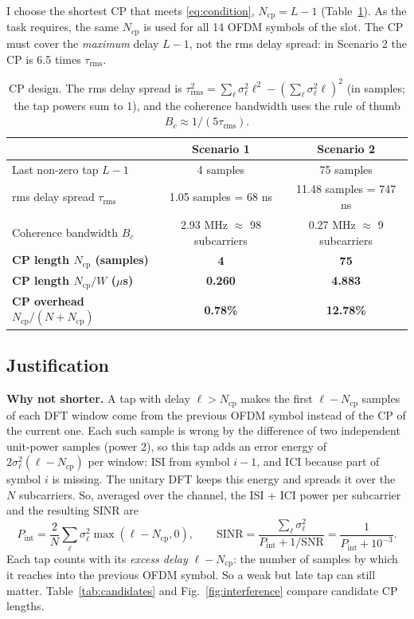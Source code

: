 \documentclass[11pt,a4paper]{article}
\newcommand{\Ncp}{N_{\mathrm{cp}}}
\newcommand{\SNR}{\mathrm{SNR}}
\begin{document}
I choose the shortest CP that meets \eqref{eq:condition}, $\Ncp = L - 1$ (Table~\ref{tab:cp}). As the
task requires, the same $\Ncp$ is used for all 14 OFDM symbols of the slot. The CP must cover the
\emph{maximum} delay $L - 1$, not the rms delay spread: in Scenario 2 the CP is 6.5 times $\tau_{\mathrm{rms}}$.

\begin{table}[!htb]
  \centering
  \caption{CP design. The rms delay spread is $\tau_{\mathrm{rms}}^2 = \sum_\ell \sigma_\ell^2 \ell^2 - (\sum_\ell \sigma_\ell^2 \ell)^2$ (in samples; the tap powers sum to 1), and the coherence bandwidth uses the rule of thumb $B_c \approx 1/(5\tau_{\mathrm{rms}})$.}
  \label{tab:cp}
  \begin{tabular}{lcc}
    \toprule
    & Scenario 1 & Scenario 2 \\
    \midrule
    Last non-zero tap $L - 1$                    & 4 samples          & 75 samples \\
    rms delay spread $\tau_{\mathrm{rms}}$       & 1.05 samples = 68 ns & 11.48 samples = 747 ns \\
    Coherence bandwidth $B_c$                    & 2.93 MHz $\approx$ 98 subcarriers & 0.27 MHz $\approx$ 9 subcarriers \\
    \midrule
    \textbf{CP length $\Ncp$ (samples)}          & \textbf{4}         & \textbf{75} \\
    \textbf{CP length $\Ncp/W$ ($\mu$s)}         & \textbf{0.260}     & \textbf{4.883} \\
    \textbf{CP overhead $\Ncp/(N + \Ncp)$}       & \textbf{0.78\%}    & \textbf{12.78\%} \\
    \bottomrule
  \end{tabular}
\end{table}

\subsection{Justification}

\textbf{Why not shorter.} A tap with delay $\ell > \Ncp$ makes the first $\ell - \Ncp$ samples of each
DFT window come from the previous OFDM symbol instead of the CP of the current one. Each such sample is
wrong by the difference of two independent unit-power samples (power 2), so this tap adds an error
energy of $2\sigma_\ell^2(\ell - \Ncp)$ per window: ISI from symbol $i - 1$, and ICI because part of symbol
$i$ is missing. The unitary DFT keeps this energy and spreads it over the $N$ subcarriers. So, averaged
over the channel, the ISI + ICI power per subcarrier and the resulting SINR are
\begin{equation}
  P_{\mathrm{int}} = \frac{2}{N} \sum_{\ell} \sigma_\ell^2 \max(\ell - \Ncp, 0), \qquad
  \mathrm{SINR} = \frac{\sum_\ell \sigma_\ell^2}{P_{\mathrm{int}} + 1/\SNR} = \frac{1}{P_{\mathrm{int}} + 10^{-3}}.
  \label{eq:pint}
\end{equation}
Each tap counts with its \emph{excess delay} $\ell - \Ncp$: the number of samples by which it reaches
into the previous OFDM symbol. So a weak but late tap can still matter. Table~\ref{tab:candidates}
and Fig.~\ref{fig:interference} compare candidate CP lengths.
\end{document}
